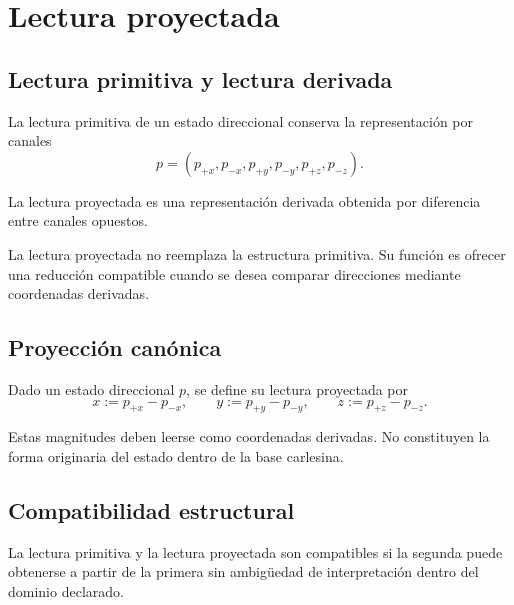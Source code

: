 \chapter{Lectura proyectada}

\section{Lectura primitiva y lectura derivada}
\begin{definition}
La lectura primitiva de un estado direccional conserva la representación por canales
\[
p=(p_{+x},p_{-x},p_{+y},p_{-y},p_{+z},p_{-z}).
\]
\end{definition}

\begin{definition}
La lectura proyectada es una representación derivada obtenida por diferencia entre canales opuestos.
\end{definition}

\begin{observation}
La lectura proyectada no reemplaza la estructura primitiva. Su función es ofrecer una reducción compatible cuando se desea comparar direcciones mediante coordenadas derivadas.
\end{observation}

\section{Proyección canónica}
\begin{definition}
Dado un estado direccional \(p\), se define su lectura proyectada por
\[
x:=p_{+x}-p_{-x},\qquad
y:=p_{+y}-p_{-y},\qquad
z:=p_{+z}-p_{-z}.
\]
\end{definition}

\begin{observation}
Estas magnitudes deben leerse como coordenadas derivadas. No constituyen la forma originaria del estado dentro de la base carlesina.
\end{observation}

\section{Compatibilidad estructural}
\begin{definition}
La lectura primitiva y la lectura proyectada son compatibles si la segunda puede obtenerse a partir de la primera sin ambigüedad de interpretación dentro del dominio declarado.
\end{definition}

